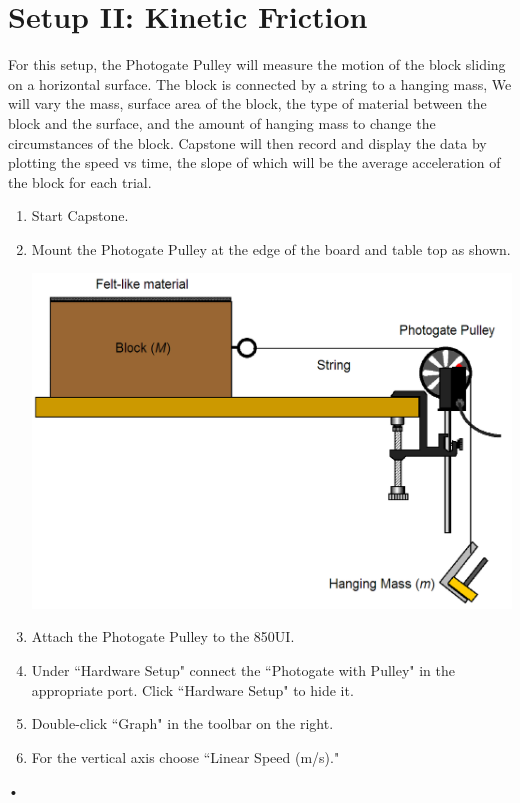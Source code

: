 \documentclass[main.tex]{subfiles}
\begin{document}
\section{Setup II: Kinetic Friction}
For this setup, the Photogate Pulley will measure the motion of the block sliding on a horizontal surface. The block is connected by a string to a hanging mass, We will vary the mass, surface area of the block, the type of material between the block and the surface, and the amount of hanging mass to change the circumstances of the block. Capstone will then record and display the data by plotting the speed vs time, the slope of which will be the average acceleration of the block for each trial.
\begin{enumerate}
\item
Start Capstone.
\item
Mount the Photogate Pulley at the edge of the board and table top as shown.

\includegraphics[width=\textwidth]{Friction_Setup}

\item
Attach the Photogate Pulley to the 850UI.
\item
Under ``Hardware Setup" connect the ``Photogate with Pulley" in the appropriate port. Click ``Hardware Setup" to hide it.
\item
Double-click ``Graph" in the toolbar on the right.
\item
For the vertical axis choose ``Linear Speed (m/s)."
\end{enumerate}•
\end{document}
